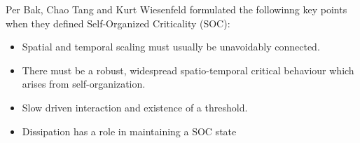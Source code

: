 \begin{frame}
Per Bak, Chao Tang and Kurt Wiesenfeld formulated the followinng key points when they defined Self-Organized Criticality (SOC):
\begin{itemize}
	\item Spatial and temporal scaling must usually be unavoidably connected.
	\item There must be a robust, widespread spatio-temporal critical behaviour which arises from self-organization.
	\item Slow driven interaction and existence of a threshold.
	\item Dissipation has a role in maintaining a SOC state
\end{itemize}
\end{frame}

